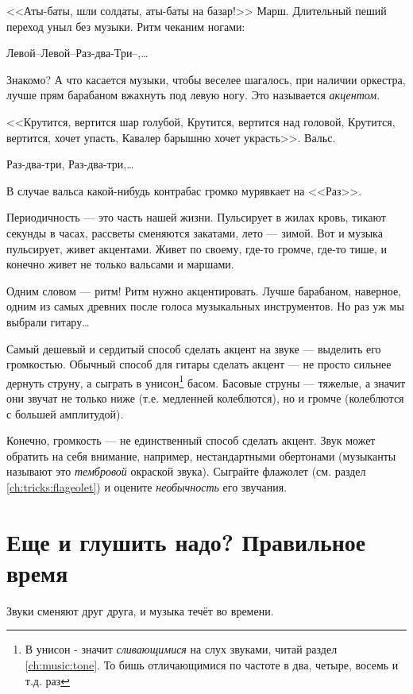 <<Аты-баты, шли солдаты, аты-баты на базар!>> Марш. Длительный пеший переход уныл без музыки. Ритм чеканим ногами: 
\begin{center}
    Левой--Левой--Раз-два-Три--,\ldots 
\end{center}
Знакомо? А что касается музыки, чтобы веселее шагалось, при наличии оркестра, лучше прям барабаном вжахнуть под левую ногу. Это называется \emph{акцентом}. 

<<Крутится, вертится шар голубой, Крутится, вертится над головой, Крутится, вертится, хочет упасть, Кавалер барышню хочет украсть>>. Вальс. 
\begin{center}
    Раз-два-три, Раз-два-три,\ldots 
\end{center}
В случае вальса какой-нибудь контрабас громко мурявкает на <<Раз>>.

Периодичность --- это часть нашей жизни. Пульсирует в жилах кровь, тикают секунды в часах, рассветы сменяются закатами, лето --- зимой. Вот и музыка пульсирует, живет акцентами. Живет по своему, где-то громче, где-то тише, и конечно живет не только вальсами и маршами.

Одним словом --- ритм! Ритм нужно акцентировать. Лучше барабаном, наверное, одним из самых древних после голоса музыкальных инструментов. Но раз уж мы выбрали гитару\ldots

Самый дешевый и сердитый способ сделать акцент на звуке --- выделить его громкостью. Обычный способ для гитары сделать акцент --- не просто сильнее дернуть струну, а сыграть в унисон\footnote{В унисон - значит \emph{сливающимися} на слух звуками, читай раздел \ref{ch:music:tone}. То бишь отличающимися по частоте в два, четыре, восемь и т.д. раз} басом. Басовые струны --- тяжелые, а значит они звучат не только ниже (т.е. медленней колеблются), но и громче (колеблются с большей амплитудой).

Конечно, громкость --- не единственный способ сделать акцент. Звук может обратить на себя внимание, например, нестандартными обертонами (музыканты называют это \emph{тембровой} окраской звука). Сыграйте флажолет (см. раздел \ref{ch:tricks:flageolet}) и оцените \emph{необычность} его звучания.


\section{Еще и глушить надо? Правильное время}
\label{ch:music:rythm}

Звуки сменяют друг друга, и музыка течёт во времени. 

